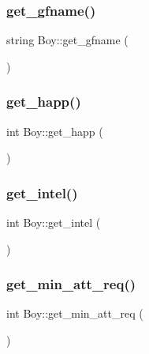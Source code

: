 \mbox{\label{classBoy_a468063de535334e0174fc87a803cd925}} 
\subsubsection{\texorpdfstring{get\+\_\+gfname()}{get\_gfname()}}
{\footnotesize\ttfamily string Boy\+::get\+\_\+gfname (\begin{DoxyParamCaption}{ }\end{DoxyParamCaption})}

\mbox{\label{classBoy_ad6ef5e1b1743304b61080a0e1ffda56f}} 
\subsubsection{\texorpdfstring{get\+\_\+happ()}{get\_happ()}}
{\footnotesize\ttfamily int Boy\+::get\+\_\+happ (\begin{DoxyParamCaption}{ }\end{DoxyParamCaption})}

\mbox{\label{classBoy_ae3cfbdc28b8cad1e6bdc8f06e49e6903}} 
\subsubsection{\texorpdfstring{get\+\_\+intel()}{get\_intel()}}
{\footnotesize\ttfamily int Boy\+::get\+\_\+intel (\begin{DoxyParamCaption}{ }\end{DoxyParamCaption})}

\mbox{\label{classBoy_acd81d7c6e595d05d5a25b9a9b6c3345b}} 
\subsubsection{\texorpdfstring{get\+\_\+min\+\_\+att\+\_\+req()}{get\_min\_att\_req()}}
{\footnotesize\ttfamily int Boy\+::get\+\_\+min\+\_\+att\+\_\+req (\begin{DoxyParamCaption}{ }\end{DoxyParamCaption})}

